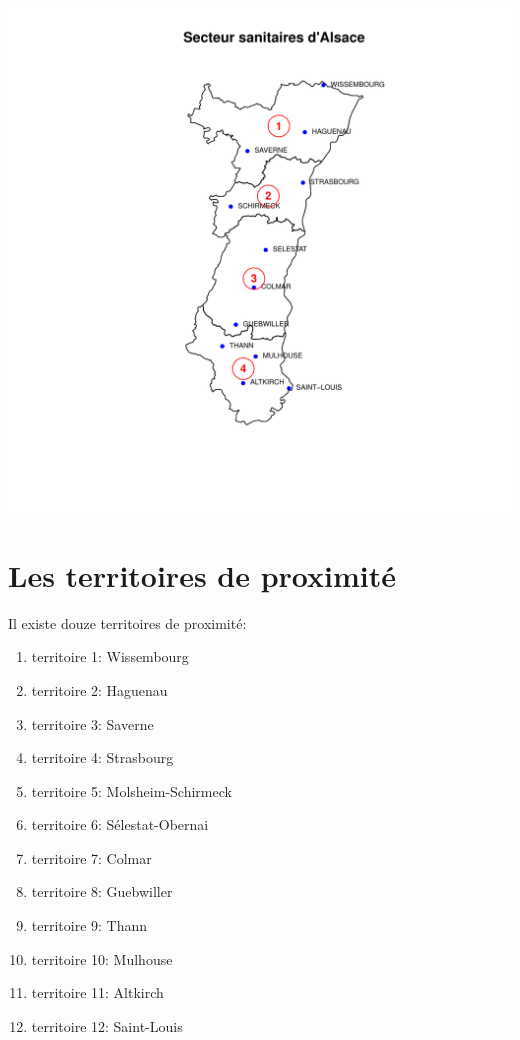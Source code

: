 \documentclass[12pt,english,french,twoside]{book}\usepackage[]{graphicx}\usepackage[]{color}
\makeatletter
\def\maxwidth{ %
  \ifdim\Gin@nat@width>\linewidth
    \linewidth
  \else
    \Gin@nat@width
  \fi
}
\newenvironment{knitrout}{}{} %
\makeatother
\begin{document}
\begin{knitrout}
\color{fgcolor}
\includegraphics[width=\maxwidth]{figure/carte_secteurs_sanitaires} 

\end{knitrout}



\section{Les territoires de proximité}

Il existe douze territoires de proximité:
\begin{enumerate}
  \item territoire 1: Wissembourg
  \item territoire 2: Haguenau
  \item territoire 3: Saverne
  \item territoire 4: Strasbourg
  \item territoire 5: Molsheim-Schirmeck
  \item territoire 6: Sélestat-Obernai
  \item territoire 7: Colmar
  \item territoire 8: Guebwiller
  \item territoire 9: Thann
  \item territoire 10: Mulhouse
  \item territoire 11: Altkirch
  \item territoire 12: Saint-Louis
\end{enumerate}
\end{document}
